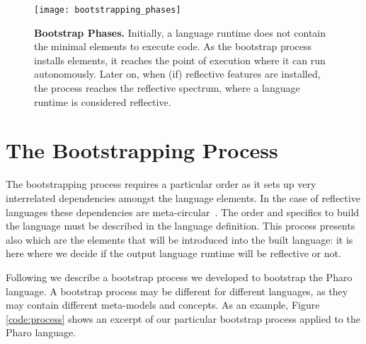

\begin{figure}[ht]
\center
\texttt{[image: bootstrapping\_phases]}
\caption{\textbf{Bootstrap Phases.} Initially, a language runtime does not contain the minimal elements to execute code. As the bootstrap process installs elements, it reaches the point of execution where it can run autonomously. Later on, when (if) reflective features are installed, the process reaches the reflective spectrum, where a language runtime is considered reflective.\label{fig:phases}}
\end{figure}

%

\section{The Bootstrapping Process}\label{sec:bootstrapping_process}
The bootstrapping process requires a particular order as it sets up very interrelated dependencies amongst the language elements. In the case of reflective languages these dependencies are meta-circular~\cite{Stra14a,Chib96a,Maes87a,Smit84a}. The order and specifics to build the language must be described in the language definition. This process presents also which are the elements that will be introduced into the built language: it is here where we decide if the output language runtime will be reflective or not.

Following we describe a bootstrap process we developed to bootstrap the Pharo language. A bootstrap process may be different for different languages, as they may contain different meta-models and concepts. As an example, Figure \ref{code:process} shows an excerpt of our particular bootstrap process applied to the Pharo language.

